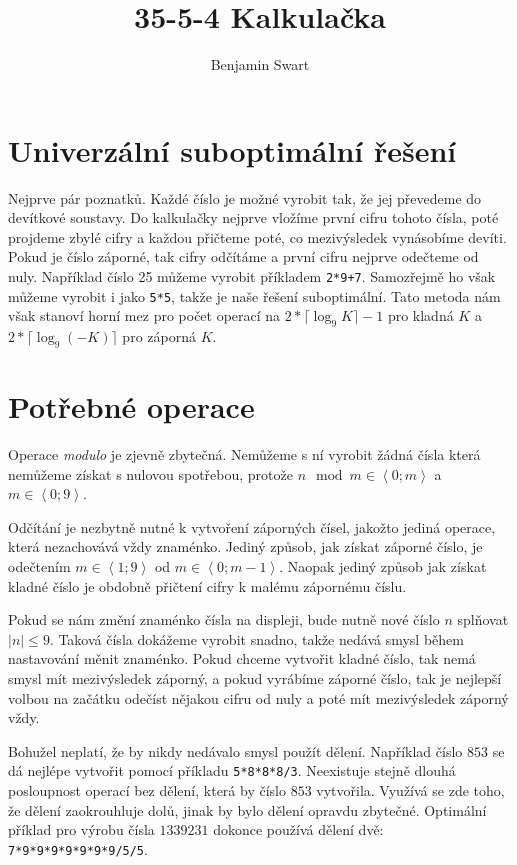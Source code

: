 \documentclass{article}
\title{35-5-4 Kalkulačka}
\author{Benjamin Swart}
\begin{document}
\maketitle

\section{Univerzální suboptimální řešení}

Nejprve pár poznatků. Každé číslo je možné vyrobit tak, že jej převedeme do devítkové soustavy. Do kalkulačky nejprve vložíme první cifru tohoto čísla, poté projdeme zbylé cifry a každou přičteme poté, co mezivýsledek vynásobíme devíti. Pokud je číslo záporné, tak cifry odčítáme a první cifru nejprve odečteme od nuly. Například číslo 25 můžeme vyrobit příkladem \texttt{2*9+7}. Samozřejmě ho však můžeme vyrobit i jako \texttt{5*5}, takže je naše řešení suboptimální. Tato metoda nám však stanoví horní mez pro počet operací na $2 * \lceil\log_9 K\rceil - 1$ pro kladná $K$ a $2 * \lceil\log_9 \left(-K\right)\rceil$ pro záporná $K$.

\section{Potřebné operace}
\label{needed}

Operace \textit{modulo} je zjevně zbytečná. Nemůžeme s ní vyrobit žádná čísla která nemůžeme získat s nulovou spotřebou, protože $n \mod m \in \left<0; m\right>$ a $m \in \left<0; 9\right>$.

Odčítání je nezbytně nutné k vytvoření záporných čísel, jakožto jediná operace, která nezachovává vždy znaménko. Jediný způsob, jak získat záporné číslo, je odečtením $m \in \left<1; 9\right>$ od $m \in \left<0; m - 1\right>$. Naopak jediný způsob jak získat kladné číslo je obdobně přičtení cifry k malému zápornému číslu.

Pokud se nám změní znaménko čísla na displeji, bude nutně nové číslo $n$ splňovat $\lvert n \rvert \leq 9$. Taková čísla dokážeme vyrobit snadno, takže nedává smysl během nastavování měnit znaménko. Pokud chceme vytvořit kladné číslo, tak nemá smysl mít mezivýsledek záporný, a pokud vyrábíme záporné číslo, tak je nejlepší volbou na začátku odečíst nějakou cifru od nuly a poté mít mezivýsledek záporný vždy.

Bohužel neplatí, že by nikdy nedávalo smysl použít dělení. Například číslo $853$ se dá nejlépe vytvořit pomocí příkladu \texttt{5*8*8*8/3}. Neexistuje stejně dlouhá posloupnost operací bez dělení, která by číslo $853$ vytvořila. Využívá se zde toho, že dělení zaokrouhluje dolů, jinak by bylo dělení opravdu zbytečné. Optimální příklad pro výrobu čísla $1339231$ dokonce používá dělení dvě: \texttt{7*9*9*9*9*9*9*9/5/5}.
\end{document}
